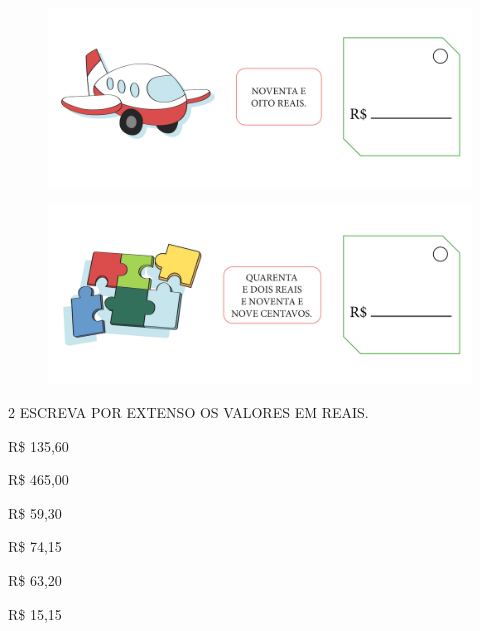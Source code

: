\begin{figure}[htpb!]
\includegraphics[width=\textwidth]{../ilustracoes/MAT1/SAEB_1ANO_MAT_FIGURA67.png}
\end{figure}

\begin{figure}[htpb!]
\includegraphics[width=\textwidth]{../ilustracoes/MAT1/SAEB_1ANO_MAT_FIGURA68.png}
\end{figure}

\pagebreak

\num{2} ESCREVA POR EXTENSO OS VALORES EM REAIS.


\begin{escolha}
\item R\$ 135,60 

\item R\$ 465,00 

\item R\$ 59,30 

\item R\$ 74,15 

\item R\$ 63,20 

\item R\$ 15,15 
\end{escolha}

